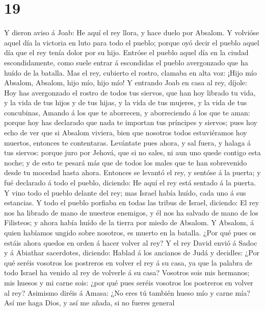 \hypertarget{section-18}{%
\section{19}\label{section-18}}

 Y dieron aviso á Joab: He aquí el rey llora, y hace duelo
por Absalom.  Y volvióse aquel día la victoria en luto para
todo el pueblo; porque oyó decir el pueblo aquel día que el rey tenía
dolor por su hijo.  Entróse el pueblo aquel día en la ciudad
escondidamente, como suele entrar á escondidas el pueblo avergonzado que
ha huído de la batalla.  Mas el rey, cubierto el rostro,
clamaba en alta voz: ¡Hijo mío Absalom, Absalom, hijo mío, hijo mío!
 Y entrando Joab en casa al rey, díjole: Hoy has avergonzado
el rostro de todos tus siervos, que han hoy librado tu vida, y la vida
de tus hijos y de tus hijas, y la vida de tus mujeres, y la vida de tus
concubinas,  Amando á los que te aborrecen, y aborreciendo á
los que te aman: porque hoy has declarado que nada te importan tus
príncipes y siervos; pues hoy echo de ver que si Absalom viviera, bien
que nosotros todos estuviéramos hoy muertos, entonces te contentaras.
 Levántate pues ahora, y sal fuera, y halaga á tus siervos:
porque juro por Jehová, que si no sales, ni aun uno quede contigo esta
noche; y de esto te pesará más que de todos los males que te han
sobrevenido desde tu mocedad hasta ahora.  Entonces se
levantó el rey, y sentóse á la puerta; y fué declarado á todo el pueblo,
diciendo: He aquí el rey está sentado á la puerta. Y vino todo el pueblo
delante del rey; mas Israel había huído, cada uno á sus estancias.
 Y todo el pueblo porfiaba en todas las tribus de Israel,
diciendo: El rey nos ha librado de mano de nuestros enemigos, y él nos
ha salvado de mano de los Filisteos; y ahora había huído de la tierra
por miedo de Absalom.  Y Absalom, á quien habíamos ungido
sobre nosotros, es muerto en la batalla. ¿Por qué pues os estáis ahora
quedos en orden á hacer volver al rey?  Y el rey David
envió á Sadoc y á Abiathar sacerdotes, diciendo: Hablad á los ancianos
de Judá y decidles: ¿Por qué seréis vosotros los postreros en volver el
rey á su casa, ya que la palabra de todo Israel ha venido al rey de
volverle á su casa?  Vosotros sois mis hermanos; mis huesos
y mi carne sois: ¿por qué pues seréis vosotros los postreros en volver
al rey?  Asimismo diréis á Amasa: ¿No eres tú también hueso
mío y carne mía? Así me haga Dios, y así me añada, si no fueres general

